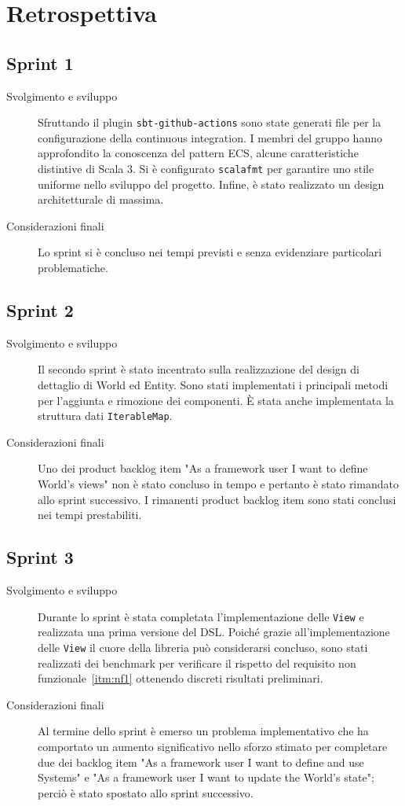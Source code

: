 \chapter{Retrospettiva}\label{ch:retrospettiva}
\section{Sprint 1}\label{sec:sprint-1}
\begin{description}
    \item [Svolgimento e sviluppo] Sfruttando il plugin \texttt{sbt-github-actions} sono state generati file per la configurazione della continuous integration.
    I membri del gruppo hanno approfondito la conoscenza del pattern ECS, alcune caratteristiche distintive di Scala 3.
    Si è configurato \texttt{scalafmt} per garantire uno stile uniforme nello sviluppo del progetto.
    Infine, è stato realizzato un design architetturale di massima.
    \item [Considerazioni finali] Lo sprint si è concluso nei tempi previsti e senza evidenziare particolari problematiche.
\end{description}
\section{Sprint 2}\label{sec:sprint-2}
\begin{description}
    \item[Svolgimento e sviluppo] Il secondo sprint è stato incentrato sulla realizzazione del design di dettaglio di World ed Entity.
    Sono stati implementati i principali metodi per l'aggiunta e rimozione dei componenti.
    È stata anche implementata la struttura dati \texttt{IterableMap}.
    \item[Considerazioni finali] Uno dei product backlog item "As a framework user I want to define World's views" non è stato concluso
    in tempo e pertanto è stato rimandato allo sprint successivo.
    I rimanenti product backlog item sono stati conclusi nei tempi prestabiliti.
\end{description}
\section{Sprint 3}\label{sec:sprint-3}
\begin{description}
    \item[Svolgimento e sviluppo] Durante lo sprint è stata completata l'implementazione delle \texttt{View} e realizzata una prima versione del DSL\@.
    Poiché grazie all'implementazione delle \texttt{View} il cuore della libreria può considerarsi concluso, sono stati realizzati dei benchmark
    per verificare il rispetto del requisito non funzionale~\ref{itm:nf1} ottenendo discreti risultati preliminari.
    \item[Considerazioni finali] Al termine dello sprint è emerso un problema implementativo che ha comportato un aumento significativo nello sforzo
    stimato per completare due dei backlog item "As a framework user I want to define and use Systems" e "As a framework user I want to update the World's state";
    perciò è stato spostato allo sprint successivo.
\end{description}
